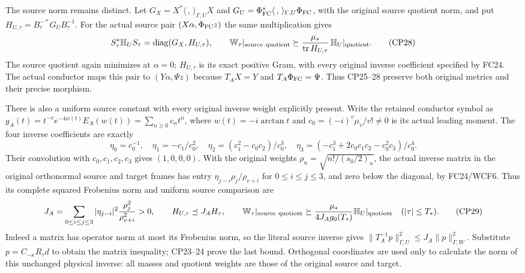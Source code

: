 \documentclass[11pt]{article}
\newcommand{\diag}{\operatorname{diag}}
\begin{document}
The source norm remains distinct. Let
$G_X=X^*\langle\, ,\,\rangle_{\Gamma,U}X$ and
$G_U=\Phi_{\rm FC}^*\langle\, ,\,\rangle_{\Gamma,U}\Phi_{\rm FC}$,
with the original source quotient norm, and put
$H_{U,\tau}=B_\tau^{-*}G_UB_\tau^{-1}$.
For the actual source pair
$(X\alpha,\Phi_{\rm FC}z)$ the same multiplication gives
\begin{equation}
S_\tau^*\mathbb H_U S_\tau=\diag(G_X,H_{U,\tau}),\qquad
\mathbb W_\tau|_{\rm source\ quotient}
\succeq
\frac{\mu_*}{\operatorname{tr}H_{U,\tau}}\,
                 \mathbb H_U|_{\rm quotient}.
\tag{CP28}
\end{equation}
The source quotient again minimizes at $\alpha=0$;
$H_{U,\tau}$ is its exact positive Gram, with every original
inverse coefficient specified by FC24. The actual conductor
maps this pair to $(Y\alpha,\Psi z)$ because
$T_AX=Y$ and $T_A\Phi_{\rm FC}=\Psi$. Thus CP25--28 preserve
both original metrics and their precise morphism.

There is also a uniform source constant with every original
inverse weight explicitly present. Write the retained conductor
symbol as
$g_A(t)=t^{-v}e^{-4w(t)}E_A(w(t))=\sum_{n\ge0}c_nt^n$,
where $w(t)=-i\arctan t$ and
$c_0=(-i)^v\mu_v/v!\ne0$ is its actual leading moment.
The four inverse coefficients are exactly
\[
\eta_0=c_0^{-1},\quad \eta_1=-c_1/c_0^2,\quad
\eta_2=(c_1^2-c_0c_2)/c_0^3,\quad
\eta_3=(-c_1^3+2c_0c_1c_2-c_0^2c_3)/c_0^4 .
\]
Their convolution with $c_0,c_1,c_2,c_3$ gives $(1,0,0,0)$.
With the original weights $\rho_n=\sqrt{n!/(s_0/2)_n}$,
the actual inverse matrix in the original orthonormal source
and target frames has entry
$\eta_{j-i}\rho_j/\rho_{v+i}$ for $0\le i\le j\le3$,
and zero below the diagonal, by FC24/WCF6.
Thus its complete squared Frobenius norm and uniform
source comparison are
\begin{equation}
J_A=\sum_{0\le i\le j\le3}
 |\eta_{j-i}|^2\frac{\rho_j^2}{\rho_{v+i}^2}>0,\qquad
H_{U,\tau}\preceq J_AH_\tau,\qquad
\mathbb W_\tau|_{\rm source\ quotient}
\succeq\frac{\mu_*}{4J_Ag_0(T_*)}
                  \mathbb H_U|_{\rm quotient}
\quad(|\tau|\le T_*).
\tag{CP29}
\end{equation}
Indeed a matrix has operator norm at most its Frobenius norm,
so the literal source inverse gives
$\|T_A^{-1}p\|_{\Gamma,U}^2\le J_A\|p\|_{\Gamma,W}^2$.
Substitute $p=C_{-\kappa}R_\tau d$ to obtain the matrix
inequality; CP23--24 prove the last bound. Orthogonal
coordinates are used only to calculate the norm of this
unchanged physical inverse: all masses and quotient weights
are those of the original source and target.
\end{document}
